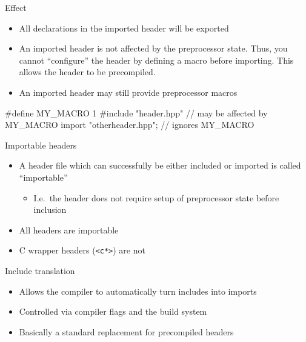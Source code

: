 \begin{frame}[fragile]
    \begin{block}{Effect}
      \begin{itemize}
      \item All declarations in the imported header will be exported
      \item An imported header is not affected by the preprocessor state.
            Thus, you cannot ``configure'' the header by defining a macro before importing.
            This allows the header to be precompiled.
      \item An imported header may still provide preprocessor macros
      \end{itemize}
    \end{block}
    \begin{cppcode}
      #define MY_MACRO 1
      #include "header.hpp" // may be affected by MY_MACRO
      import "otherheader.hpp"; // ignores MY_MACRO
    \end{cppcode}
\end{frame}

\begin{frame}[fragile]
    \begin{block}{Importable headers}
      \begin{itemize}
      \item A header file which can successfully be either included or imported is called ``importable''
      \begin{itemize}
        \item I.e.\ the header does not require setup of preprocessor state before inclusion
      \end{itemize}
      \item All  headers are importable
      \item C wrapper headers (\texttt{<c*>}) are not
      \end{itemize}
    \end{block}
    \begin{block}{Include translation}
      \begin{itemize}
        \item Allows the compiler to automatically turn includes into imports
        \item Controlled via compiler flags and the build system
        \item Basically a standard replacement for precompiled headers
      \end{itemize}
    \end{block}
\end{frame}

